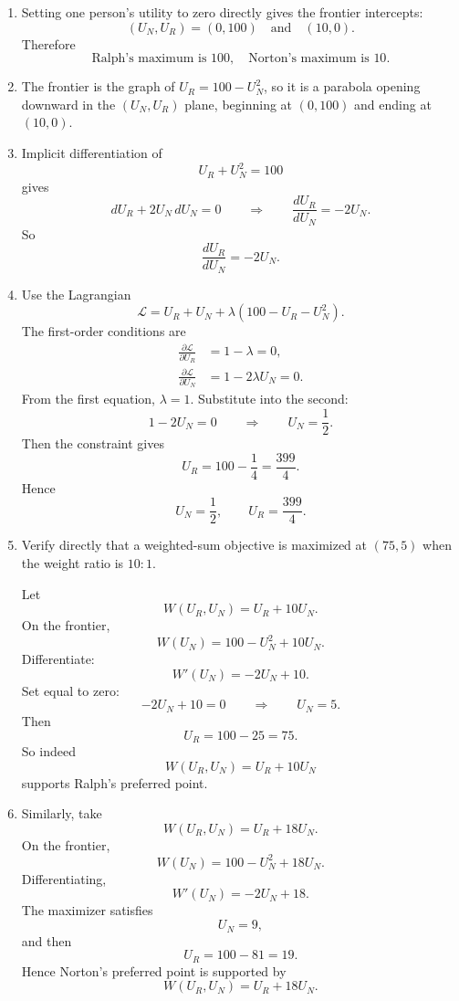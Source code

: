\documentclass[12pt]{article}
\begin{document}
\begin{enumerate}[label=(\alph*)]
    \item
    Setting one person's utility to zero directly gives the frontier intercepts:
    \[
    (U_N,U_R)=(0,100)
    \quad\text{and}\quad
    (10,0).
    \]
    Therefore
    \[
    \boxed{\text{Ralph's maximum is }100,\quad \text{Norton's maximum is }10.}
    \]

    \item
    The frontier is the graph of $U_R=100-U_N^2$, so it is a parabola opening downward in the $(U_N,U_R)$ plane, beginning at $(0,100)$ and ending at $(10,0)$.

    \item
    Implicit differentiation of
    \[
    U_R+U_N^2=100
    \]
    gives
    \[
    dU_R+2U_N\,dU_N=0
    \qquad\Longrightarrow\qquad
    \frac{dU_R}{dU_N}=-2U_N.
    \]
    So
    \[
    \boxed{\frac{dU_R}{dU_N}=-2U_N.}
    \]

    \item
    Use the Lagrangian
    \[
    \mathcal L = U_R+U_N + \lambda(100-U_R-U_N^2).
    \]
    The first-order conditions are
    \begin{align*}
        \frac{\partial \mathcal L}{\partial U_R} &= 1-\lambda=0,\\
        \frac{\partial \mathcal L}{\partial U_N} &= 1-2\lambda U_N=0.
    \end{align*}
    From the first equation, $\lambda=1$. Substitute into the second:
    \[
    1-2U_N=0
    \qquad\Longrightarrow\qquad
    U_N=\frac12.
    \]
    Then the constraint gives
    \[
    U_R = 100-\frac14=\frac{399}{4}.
    \]
    Hence
    \[
    \boxed{U_N=\frac12,\qquad U_R=\frac{399}{4}.}
    \]

    \item
    Verify directly that a weighted-sum objective is maximized at $(75,5)$ when the weight ratio is $10:1$.

    Let
    \[
    W(U_R,U_N)=U_R+10U_N.
    \]
    On the frontier,
    \[
    W(U_N)=100-U_N^2+10U_N.
    \]
    Differentiate:
    \[
    W'(U_N)=-2U_N+10.
    \]
    Set equal to zero:
    \[
    -2U_N+10=0
    \qquad\Longrightarrow\qquad
    U_N=5.
    \]
    Then
    \[
    U_R=100-25=75.
    \]
    So indeed
    \[
    \boxed{W(U_R,U_N)=U_R+10U_N}
    \]
    supports Ralph's preferred point.

    \item
    Similarly, take
    \[
    W(U_R,U_N)=U_R+18U_N.
    \]
    On the frontier,
    \[
    W(U_N)=100-U_N^2+18U_N.
    \]
    Differentiating,
    \[
    W'(U_N)=-2U_N+18.
    \]
    The maximizer satisfies
    \[
    U_N=9,
    \]
    and then
    \[
    U_R=100-81=19.
    \]
    Hence Norton's preferred point is supported by
    \[
    \boxed{W(U_R,U_N)=U_R+18U_N.}
    \]
\end{enumerate}
\end{document}
